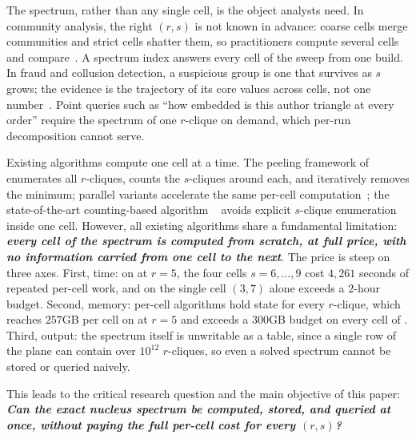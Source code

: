 The spectrum, rather than any single cell, is the object analysts need.
%
In community analysis, the right $(r,s)$ is not known in advance: coarse cells merge communities and strict cells shatter them, so practitioners compute several cells and compare~\cite{firstNucleus, nuclearTWEB}.
%
A spectrum index answers every cell of the sweep from one build.
%
In fraud and collusion detection, a suspicious group is one that survives as $s$ grows; the evidence is the trajectory of its core values across cells, not one number~\cite{jiang2016catching}.
%
Point queries such as ``how embedded is this author triangle at every order'' require the spectrum of one $r$-clique on demand, which per-run decomposition cannot serve.

Existing algorithms compute one cell at a time.
%
The peeling framework of~\cite{firstNucleus, nuclearTWEB} enumerates all $r$-cliques, counts the $s$-cliques around each, and iteratively removes the minimum; parallel variants accelerate the same per-cell computation~\cite{sotaPrveHierarchy}; the state-of-the-art counting-based algorithm \cnd~\cite{LocalNuclear} avoids explicit $s$-clique enumeration inside one cell.
%
However, all existing algorithms share a fundamental limitation: \textbf{\textit{every cell of the spectrum is computed from scratch, at full price, with no information carried from one cell to the next}}.
%
The price is steep on three axes.
%
First, time: on \daDBL{} at $r{=}5$, the four cells $s=6,\dots,9$ cost $4{,}261$ seconds of repeated per-cell work, and on \daHEP{} the single cell $(3,7)$ alone exceeds a $2$-hour budget.
%
Second, memory: per-cell algorithms hold state for every $r$-clique, which reaches $257$GB per cell on \daDBL{} at $r{=}5$ and exceeds a $300$GB budget on every cell of \daWIT{}.
%
Third, output: the spectrum itself is unwritable as a table, since a single row of the plane can contain over $10^{12}$ $r$-cliques, so even a solved spectrum cannot be stored or queried naively.

This leads to the critical research question and the main objective of this paper: \textbf{\textit{Can the exact nucleus spectrum be computed, stored, and queried at once, without paying the full per-cell cost for every $(r,s)$?}}

